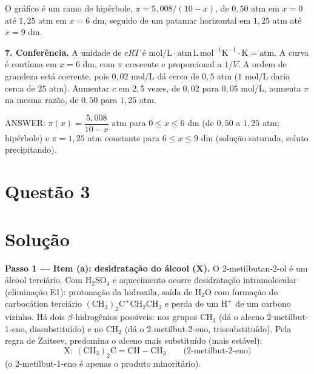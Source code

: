 \documentclass{article}%
\begin{document}
\begin{center}
\end{center}

O gráfico é um ramo de hipérbole, $\pi=5{,}008/(10-x)$, de $0{,}50$ atm em $x=0$ até $1{,}25$ atm em $x=6$ dm, seguido de um patamar horizontal em $1{,}25$ atm até $x=9$ dm.

\textbf{7. Conferência.} A unidade de $cRT$ é $\text{mol/L}\cdot\text{atm}\,\text{L}\,\text{mol}^{-1}\text{K}^{-1}\cdot\text{K}=\text{atm}$. A curva é contínua em $x=6$ dm, com $\pi$ crescente e proporcional a $1/V$. A ordem de grandeza está coerente, pois $0{,}02$ mol/L dá cerca de $0{,}5$ atm ($1$ mol/L daria cerca de $25$ atm). Aumentar $c$ em $2{,}5$ vezes, de $0{,}02$ para $0{,}05$ mol/L, aumenta $\pi$ na mesma razão, de $0{,}50$ para $1{,}25$ atm.

ANSWER: $\pi(x)=\dfrac{5{,}008}{10-x}$ atm para $0\le x\le 6$ dm (de $0{,}50$ a $1{,}25$ atm; hipérbole) e $\pi=1{,}25$ atm constante para $6\le x\le 9$ dm (solução saturada, soluto precipitando).%
\newpage%
\section*{Questão 3}

\section*{Solução}

\textbf{Passo 1 --- Item (a): desidratação do álcool (X).}
O 2-metilbutan-2-ol é um álcool terciário. Com $\mathrm{H_2SO_4}$ e aquecimento ocorre desidratação intramolecular (eliminação E1): protonação da hidroxila, saída de $\mathrm{H_2O}$ com formação do carbocátion terciário $\mathrm{(CH_3)_2C^{+}CH_2CH_3}$ e perda de um $\mathrm{H^+}$ de um carbono vizinho. Há dois $\beta$-hidrogênios possíveis: nos grupos $\mathrm{CH_3}$ (dá o alceno 2-metilbut-1-eno, dissubstituído) e no $\mathrm{CH_2}$ (dá o 2-metilbut-2-eno, trissubstituído). Pela regra de Zaitsev, predomina o alceno mais substituído (mais estável):
\[
\boxed{\mathrm{X:\ (CH_3)_2C{=}CH{-}CH_3}}\qquad\text{(2-metilbut-2-eno)}
\]
(o 2-metilbut-1-eno é apenas o produto minoritário).
\end{document}
